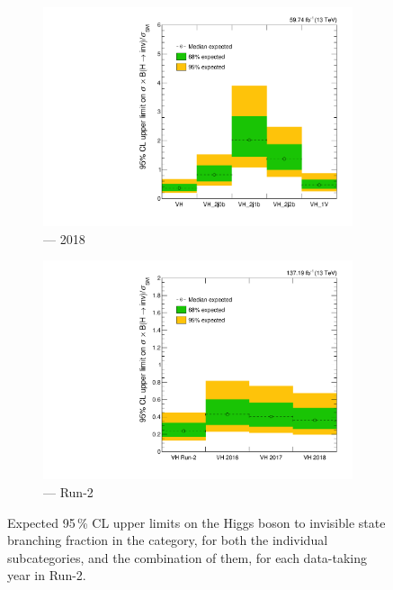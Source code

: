 \begin{figure}[htbp]
    \begin{subfigure}[b]{0.45\textwidth}
        \includegraphics[width=\textwidth]{figures/limits/VH/limit_2018_VH_Scenario5.pdf}
        \caption{\VH --- 2018}
    \end{subfigure}
    \hfill
    \begin{subfigure}[b]{0.45\textwidth}
        \includegraphics[width=\textwidth]{figures/limits/VH/limit_Run2_VH_Scenario5.pdf}
        \caption{\VH --- Run-2}
    \end{subfigure}
    \caption[Expected 95\,\% CL upper limits on the Higgs boson to invisible state branching fraction in the \VH category, for both the individual subcategories, and the combination of them, for each data-taking year in Run-2]{Expected 95\,\% CL upper limits on the Higgs boson to invisible state branching fraction in the \VH category, for both the individual subcategories, and the combination of them, for each data-taking year in Run-2.}
    \label{fig:htoinv_limit_VH}
\end{figure}



